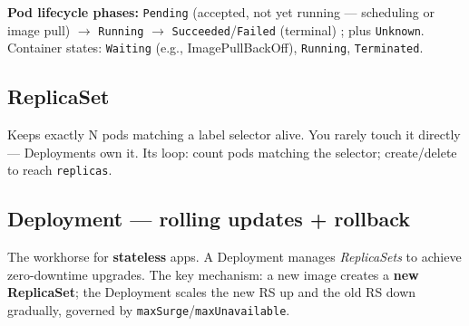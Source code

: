 \documentclass[11pt]{article}
\begin{document}
\textbf{Pod lifecycle phases:} \texttt{Pending} (accepted, not yet running --- scheduling or image pull) \(\rightarrow\) \texttt{Running} \(\rightarrow\) \texttt{Succeeded}/\texttt{Failed} (terminal) ; plus \texttt{Unknown}. Container states: \texttt{Waiting} (e.g., ImagePullBackOff), \texttt{Running}, \texttt{Terminated}.

\subsection{ReplicaSet}\label{replicaset}

Keeps exactly N pods matching a label selector alive. You rarely touch it directly --- Deployments own it. Its loop: count pods matching the selector; create/delete to reach \texttt{replicas}.

\subsection{Deployment --- rolling updates + rollback}\label{deployment--rolling-updates--rollback}

The workhorse for \textbf{stateless} apps. A Deployment manages \emph{ReplicaSets} to achieve zero-downtime upgrades. The key mechanism: a new image creates a \textbf{new ReplicaSet}; the Deployment scales the new RS up and the old RS down gradually, governed by \texttt{maxSurge}/\texttt{maxUnavailable}.

\end{document}
